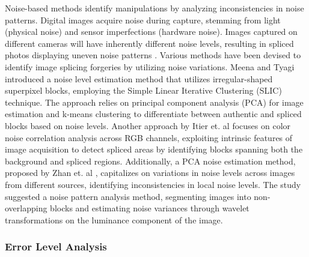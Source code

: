 Noise-based methods identify manipulations by analyzing inconsistencies in noise patterns. Digital images acquire noise during capture, stemming from light (physical noise) and sensor imperfections (hardware noise). Images captured on different cameras will have inherently different noise levels, resulting in spliced photos displaying uneven noise patterns \cite{verma2013comparative}. Various methods have been devised to identify image splicing forgeries by utilizing noise variations. Meena and Tyagi \cite{meena2023image} introduced a noise level estimation method that utilizes irregular-shaped superpixel blocks, employing the Simple Linear Iterative Clustering (SLIC) technique. The approach relies on principal component analysis (PCA) for image estimation and k-means clustering to differentiate between authentic and spliced blocks based on noise levels. Another approach by Itier et. al \cite{itier2021color} focuses on color noise correlation analysis across RGB channels, exploiting intrinsic features of image acquisition to detect spliced areas by identifying blocks spanning both the background and spliced regions. Additionally, a PCA noise estimation method, proposed by Zhan et. al \cite{zhan2015passive}, capitalizes on variations in noise levels across images from different sources, identifying inconsistencies in local noise levels. The study \cite{mahawatta2018image} suggested a noise pattern analysis method, segmenting images into non-overlapping blocks and estimating noise variances through wavelet transformations on the luminance component of the image.

\subsubsection{Error Level Analysis}\label{sec:ss2}

